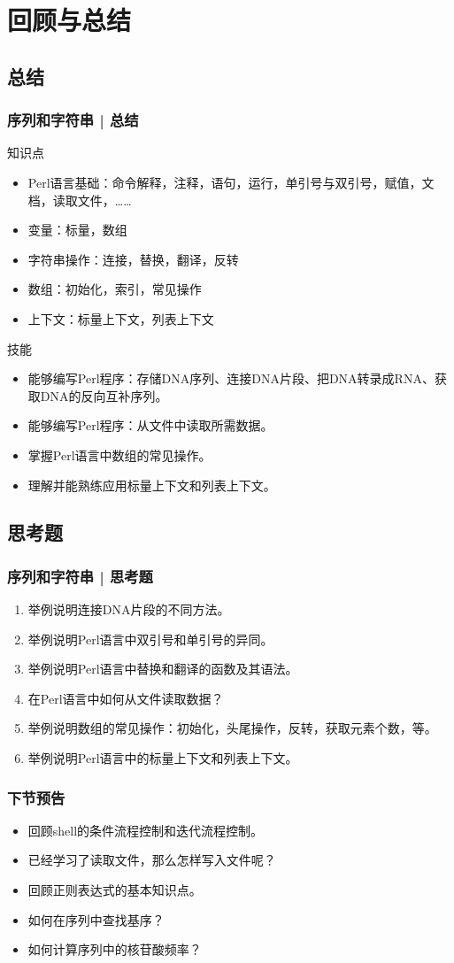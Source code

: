 \section{回顾与总结}
\subsection{总结}
\begin{frame}
  \frametitle{序列和字符串 | 总结}
  \begin{block}{知识点}
    \begin{itemize}
      \item Perl语言基础：命令解释，注释，语句，运行，单引号与双引号，赋值，文档，读取文件，……
      \item 变量：标量，数组
      \item 字符串操作：连接，替换，翻译，反转
      \item 数组：初始化，索引，常见操作
      \item 上下文：标量上下文，列表上下文
    \end{itemize}
  \end{block}
  \pause
  \begin{block}{技能}
    \begin{itemize}
      \item 能够编写Perl程序：存储DNA序列、连接DNA片段、把DNA转录成RNA、获取DNA的反向互补序列。
      \item 能够编写Perl程序：从文件中读取所需数据。
      \item 掌握Perl语言中数组的常见操作。
      \item 理解并能熟练应用标量上下文和列表上下文。
    \end{itemize}
  \end{block}
\end{frame}

\subsection{思考题}
\begin{frame}
  \frametitle{序列和字符串 | 思考题}
  \begin{enumerate}
    \item 举例说明连接DNA片段的不同方法。
    \item 举例说明Perl语言中双引号和单引号的异同。
    \item 举例说明Perl语言中替换和翻译的函数及其语法。
    \item 在Perl语言中如何从文件读取数据？
    \item 举例说明数组的常见操作：初始化，头尾操作，反转，获取元素个数，等。
    \item 举例说明Perl语言中的标量上下文和列表上下文。
  \end{enumerate}
\end{frame}

\begin{frame}
  \frametitle{下节预告}
  \begin{itemize}
    \item 回顾shell的条件流程控制和迭代流程控制。
    \item 已经学习了读取文件，那么怎样写入文件呢？
    \item 回顾正则表达式的基本知识点。
    \item 如何在序列中查找基序？
    \item 如何计算序列中的核苷酸频率？
  \end{itemize}
\end{frame}



